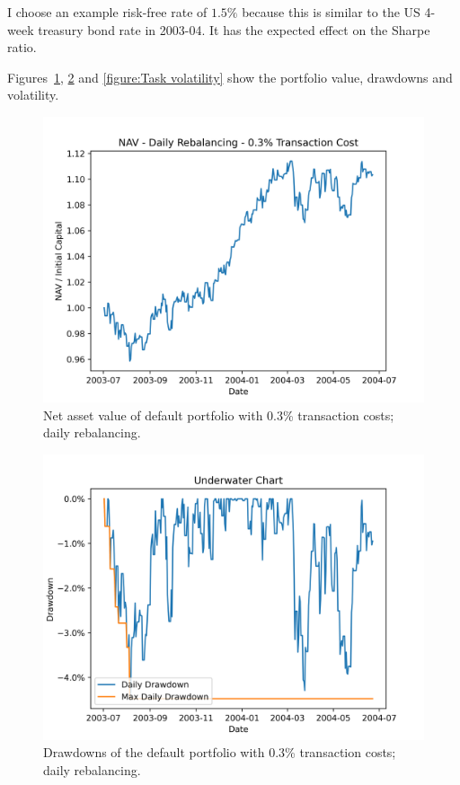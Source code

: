 \documentclass[12pt, oneside, a4paper]{article}
\begin{document}
I choose an example risk-free rate of $1.5\%$ because this is similar to the US 4-week treasury bond rate in 2003-04. It has the expected effect on the Sharpe ratio.

Figures~\ref{figure:Task NAV}, \ref{figure:Task underwater} and \ref{figure:Task volatility} show the portfolio value, drawdowns and volatility.


\begin{figure}
\centering
\includegraphics[width=0.7\linewidth]{./figures/nav.png}
\caption{Net asset value of default portfolio with 0.3\% transaction costs; daily rebalancing.}
\label{figure:Task NAV}
\end{figure}

\begin{figure}
\centering
\includegraphics[width=0.7\linewidth]{./figures/underwater.png}
\caption{Drawdowns of the default portfolio with 0.3\% transaction costs; daily rebalancing.}
\label{figure:Task underwater}
\end{figure}
\end{document}
